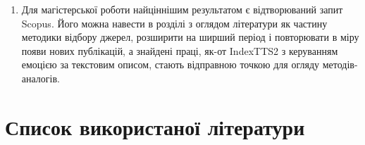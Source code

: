 \documentclass[14pt,a4paper]{extreport}
\begin{document}
\begin{enumerate}[ref=\arabic*]
\item Для магістерської роботи найціннішим результатом є відтворюваний запит Scopus. Його можна навести в розділі з оглядом літератури як частину методики відбору джерел, розширити на ширший період і повторювати в міру появи нових публікацій, а знайдені праці, як-от IndexTTS2 з керуванням емоцією за текстовим описом, стають відправною точкою для огляду методів-аналогів.
\end{enumerate}

\section{Список використаної літератури}

\printbibliography[heading=none]
\end{document}
